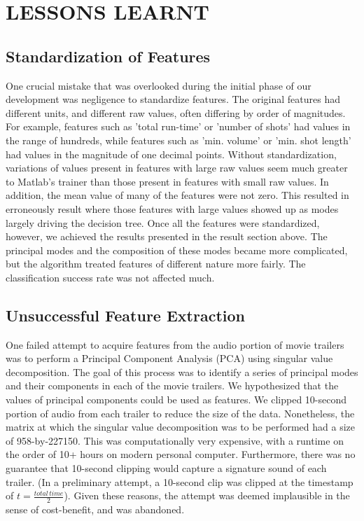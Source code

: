 \documentclass[letterpaper, 10 pt, conference]{ieeeconf}  %
\begin{document}
\section{LESSONS LEARNT}
\subsection{Standardization of Features}
One crucial mistake that was overlooked during the initial phase of our development was negligence to standardize features. The original features had different units, and different raw values, often differing by order of magnitudes. For example, features such as 'total run-time' or 'number of shots' had values in the range of hundreds, while features such as 'min. volume' or 'min. shot length' had values in the magnitude of one decimal points. Without standardization, variations of values present in features with large raw values seem much greater to Matlab's trainer than those present in features with small raw values. In addition, the mean value of many of the features were not zero. This resulted in erroneously result where those features with large values showed up as modes largely driving the decision tree. Once all the features were standardized, however, we achieved the results presented in the result section above. The principal modes and the composition of these modes became more complicated, but the algorithm treated features of different nature more fairly. The classification success rate was not affected much.
\subsection{Unsuccessful Feature Extraction}
One failed attempt to acquire features from the audio portion of movie trailers was to perform a Principal Component Analysis (PCA) using singular value decomposition. The goal of this process was to identify a series of principal modes and their components in each of the movie trailers. We hypothesized that the values of principal components could be used as features. We clipped 10-second portion of audio from each trailer to reduce the size of the data. Nonetheless, the matrix at which the singular value decomposition was to be performed had a size of 958-by-227150. This was computationally very expensive, with a runtime on the order of 10+ hours on modern personal computer. Furthermore, there was no guarantee that 10-second clipping would capture a signature sound of each trailer. (In a preliminary attempt, a 10-second clip was clipped at the timestamp of $t=\frac{total\, time}{2}$). Given these reasons, the attempt was deemed implausible in the sense of cost-benefit, and was abandoned.
\end{document}
